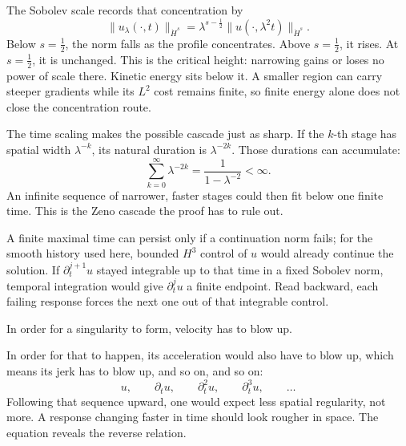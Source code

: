 \documentclass[12pt]{article}
\begin{document}
The Sobolev scale records that concentration by
\[
  \|u_\lambda(\cdot,t)\|_{\dot H^s}
  =
  \lambda^{s-\frac12}
  \|u(\cdot,\lambda^2t)\|_{\dot H^s}.
\]
Below \(s=\tfrac12\), the norm falls as the profile concentrates. Above
\(s=\tfrac12\), it rises. At \(s=\tfrac12\), it is unchanged. This is the
critical height: narrowing gains or loses no power of scale there. Kinetic
energy sits below it. A smaller region can
carry steeper gradients while its \(L^2\) cost remains finite, so finite energy
alone does not close the concentration route.

The time scaling makes the possible cascade just as sharp. If the \(k\)-th
stage has spatial width \(\lambda^{-k}\), its natural duration is
\(\lambda^{-2k}\). Those durations can accumulate:
\[
  \sum_{k=0}^{\infty}\lambda^{-2k}
  =
  \frac{1}{1-\lambda^{-2}}
  <
  \infty.
\]
An infinite sequence of narrower, faster stages could then fit below one
finite time. This is the Zeno cascade the proof has to rule out.

A finite maximal time can persist only if a continuation norm fails; for the
smooth history used here, bounded \(H^3\) control of \(u\) would already
continue the solution. If \(\partial_t^{j+1}u\) stayed integrable up to that
time in a fixed Sobolev norm, temporal integration would give
\(\partial_t^ju\) a finite endpoint. Read backward, each failing response
forces the next one out of that integrable control.

In order for a singularity to form, velocity has to blow up.

In order for that to happen, its acceleration would also have to blow up,
which means its jerk has to blow up, and so on, and so on:
\[
  u,\qquad
  \partial_tu,\qquad
  \partial_t^2u,\qquad
  \partial_t^3u,\qquad\ldots
\]
Following that sequence upward, one would expect less spatial regularity, not
more. A response changing faster in time should look rougher in space. The
equation reveals the reverse relation.
\end{document}
